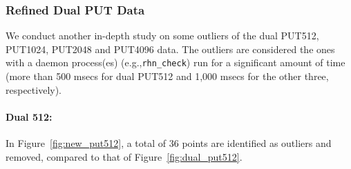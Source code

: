 \documentclass[10pt]{article}
\begin{document}
\clearpage
\newpage

\subsubsection{Refined Dual PUT Data}

We conduct another in-depth study on some outliers of the dual PUT512, PUT1024, PUT2048 and PUT4096 data.
The outliers are considered the ones with a daemon process(es) (e.g.,{\tt rhn\_check}) run for 
a significant amount of time (more than 500 msecs for dual PUT512 and 1,000 msecs for the other three, respectively).

\paragraph{Dual 512:} In Figure~\ref{fig:new_put512}, a total of 36 points are identified as outliers and removed, compared to that of Figure~\ref{fig:dual_put512}.
\end{document}
